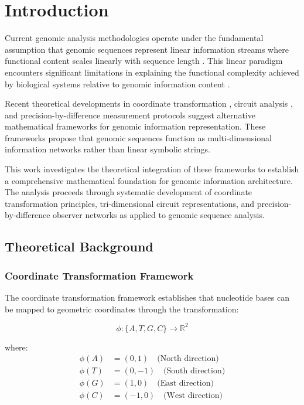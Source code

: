 \documentclass[12pt,a4paper]{article}
\begin{document}
\section{Introduction}

Current genomic analysis methodologies operate under the fundamental assumption that genomic sequences represent linear information streams where functional content scales linearly with sequence length \cite{watson1953molecular, venter2001sequence}. This linear paradigm encounters significant limitations in explaining the functional complexity achieved by biological systems relative to genomic information content \cite{encode2012integrated}.

Recent theoretical developments in coordinate transformation \cite{sachikonye2024sequence}, circuit analysis \cite{sachikonye2024circuits}, and precision-by-difference measurement protocols \cite{sachikonye2024precision} suggest alternative mathematical frameworks for genomic information representation. These frameworks propose that genomic sequences function as multi-dimensional information networks rather than linear symbolic strings.

This work investigates the theoretical integration of these frameworks to establish a comprehensive mathematical foundation for genomic information architecture. The analysis proceeds through systematic development of coordinate transformation principles, tri-dimensional circuit representations, and precision-by-difference observer networks as applied to genomic sequence analysis.

\subsection{Theoretical Background}

\subsubsection{Coordinate Transformation Framework}

The coordinate transformation framework \cite{sachikonye2024sequence} establishes that nucleotide bases can be mapped to geometric coordinates through the transformation:

\begin{equation}
\phi: \{A, T, G, C\} \rightarrow \mathbb{R}^2
\end{equation}

where:
\begin{align}
\phi(A) &= (0, 1) \quad \text{(North direction)} \\
\phi(T) &= (0, -1) \quad \text{(South direction)} \\
\phi(G) &= (1, 0) \quad \text{(East direction)} \\
\phi(C) &= (-1, 0) \quad \text{(West direction)}
\end{align}
\end{document}
